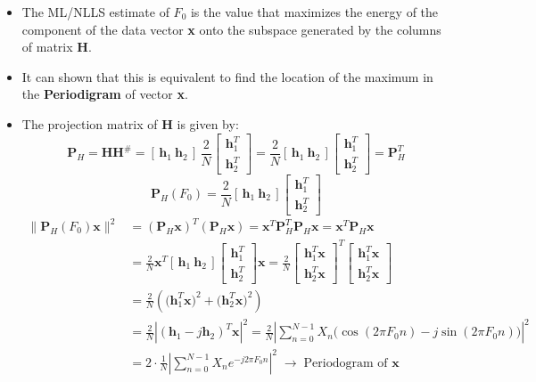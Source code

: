 \begin{itemize}
\item The ML/NLLS estimate of \(F_0\) is the value that maximizes the energy of the component of the data vector \textbf{x} onto the subspace generated by the columns of matrix \textbf{H}.
\item It can shown that this is equivalent to find the location of the maximum in the \textbf{Periodigram} of vector \textbf{x}.
\item The projection matrix of \textbf{H} is given by:
\[
\mathbf{P}_{H}
= \mathbf{H}\mathbf{H}^{\#}
= [\,\mathbf{h}_{1}\ \mathbf{h}_{2}\,]\,
\frac{2}{N}
\begin{bmatrix}
\mathbf{h}_{1}^{T} \\
\mathbf{h}_{2}^{T}
\end{bmatrix}
= \frac{2}{N}
[\,\mathbf{h}_{1}\ \mathbf{h}_{2}\,]
\begin{bmatrix}
\mathbf{h}_{1}^{T} \\
\mathbf{h}_{2}^{T}
\end{bmatrix}
= \mathbf{P}_{H}^{T}
\]
\[
\mathbf{P}_{H}(F_{0}) = \frac{2}{N}
[\,\mathbf{h}_{1}\ \mathbf{h}_{2}\,]
\begin{bmatrix}
\mathbf{h}_{1}^{T} \\
\mathbf{h}_{2}^{T}
\end{bmatrix}
\]
\vspace{-1.5em}
\begin{align*}
\big\|\mathbf{P}_{H}(F_{0})\mathbf{x}\big\|^{2}
&= (\mathbf{P}_{H}\mathbf{x})^{T}(\mathbf{P}_{H}\mathbf{x})
 = \mathbf{x}^{T}\mathbf{P}_{H}^{T}\mathbf{P}_{H}\mathbf{x}
 = \mathbf{x}^{T}\mathbf{P}_{H}\mathbf{x} \\[4pt]
&= \frac{2}{N}\mathbf{x}^{T}
[\,\mathbf{h}_{1}\ \mathbf{h}_{2}\,]
\begin{bmatrix}
\mathbf{h}_{1}^{T} \\
\mathbf{h}_{2}^{T}
\end{bmatrix}
\mathbf{x}
= \frac{2}{N}
\begin{bmatrix}
\mathbf{h}_{1}^{T}\mathbf{x} \\
\mathbf{h}_{2}^{T}\mathbf{x}
\end{bmatrix}^{T}
\begin{bmatrix}
\mathbf{h}_{1}^{T}\mathbf{x} \\
\mathbf{h}_{2}^{T}\mathbf{x}
\end{bmatrix} \\[4pt]
&= \frac{2}{N}
\left(\big(\mathbf{h}_{1}^{T}\mathbf{x}\big)^{2}
      + \big(\mathbf{h}_{2}^{T}\mathbf{x}\big)^{2}\right) \\[4pt]
&= \frac{2}{N}
\left|(\mathbf{h}_{1}-j\mathbf{h}_{2})^{T}\mathbf{x}\right|^{2}
= \frac{2}{N}
\left|\sum_{n=0}^{N-1}
X_{n}\big(\cos(2\pi F_{0}n)-j\sin(2\pi F_{0}n)\big)\right|^{2} \\[4pt]
&= 2\cdot \frac{1}{N}
\left|\sum_{n=0}^{N-1} X_{n}e^{-j2\pi F_{0}n}\right|^{2}
\;\longrightarrow\; \text{Periodogram of } \mathbf{x}
\end{align*}


\end{itemize}
